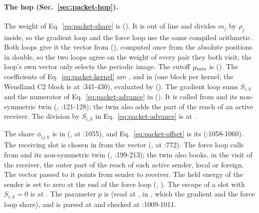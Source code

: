 \paragraph{The hop (Sec.~\ref{sec:packet-hop}).} The weight of
Eq.~\eqref{eq:packet-share} is 
(). It is out of line and divides $m_j$ by
$\rho_j$ inside, so the gradient loop and the force loop use the same compiled
arithmetic. Both loops give it the vector from
 (),
computed once from the absolute positions in double, so the two loops agree on
the weight of every pair they both visit; the loop's own vector only selects the periodic image. The cutoff $\mu_{\rm min}$ is 
(). The coefficients of
Eq.~\eqref{eq:packet-kernel} are , 
and  in  (one block per kernel;
the Wendland C2 block is at :341-430), evaluated by 
(). The gradient loop sums $S_{i,k}$ and the
numerator of Eq.~\eqref{eq:packet-advance} in
(). It is called from
 and its non-symmetric twin
(, :121-128); the
twin also adds the part of the reach of an active receiver. The division by
$S_{i,k}$ in Eq.~\eqref{eq:packet-advance} is at
.

The share $\phi_{ij,k}$ is  in
 (,
 at :1055), and Eq.~\eqref{eq:packet-offset} is its
 (:1058-1060). The receiving slot is chosen in
 from the vector 
(,  at :772). The force
loop calls  from
 and its non-symmetric twin
(, :199-213); the twin also books,
in the visit of the receiver, the outer part of the reach of each active
sender, local or foreign. The vector 
passed to it points from sender to receiver. The held energy of the sender is
set to zero at the end of the force loop (,
). The escape of a slot with $S_{i,k}=0$ is
at . The parameter $p$ is
 (read at , in
, which the gradient and the force loop share), and  is parsed at 
and checked at :1009-1011.

